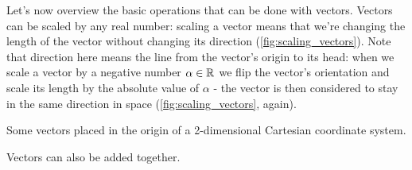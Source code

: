 Let's now overview the basic operations that can be done with vectors. Vectors can be scaled by any real number: scaling a vector means that we're changing the length of the vector without changing its direction (\cref{fig:scaling_vectors}). Note that direction here means the line from the vector's origin to its head: when we scale a vector by a negative number $\alpha\in\mathbb{R}^{}$ we flip the vector's orientation and scale its length by the absolute value of $\alpha$ - the vector is then considered to stay in the same direction in space (\cref{fig:scaling_vectors}, again).

\begin{marginfigure}
    \caption{Some vectors placed in the origin of a 2-dimensional Cartesian coordinate system.}
    \label{fig:scaling_vectors}
\end{marginfigure}

Vectors can also be added together.

